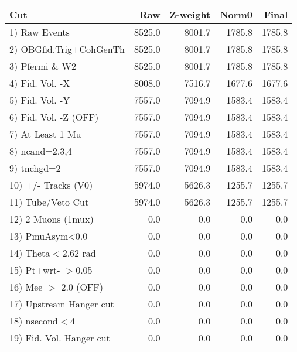  \begin{table}[h!]\centering
 \begin{tabular}{||l||r|r|r|r||}
 \hline
 \hline
 Cut & Raw & Z-weight & Norm0 & Final \\
 \hline
  1) Raw Events           &      8525.0 &      8001.7 &      1785.8 &      1785.8 \\
  2) OBGfid,Trig+CohGenTh &      8525.0 &      8001.7 &      1785.8 &      1785.8 \\
  3) Pfermi \& W2         &      8525.0 &      8001.7 &      1785.8 &      1785.8 \\
  4) Fid. Vol. -X         &      8008.0 &      7516.7 &      1677.6 &      1677.6 \\
  5) Fid. Vol. -Y         &      7557.0 &      7094.9 &      1583.4 &      1583.4 \\
  6) Fid. Vol. -Z (OFF)   &      7557.0 &      7094.9 &      1583.4 &      1583.4 \\
  7) At Least 1 Mu        &      7557.0 &      7094.9 &      1583.4 &      1583.4 \\
  8) ncand=2,3,4          &      7557.0 &      7094.9 &      1583.4 &      1583.4 \\
  9) tnchgd=2             &      7557.0 &      7094.9 &      1583.4 &      1583.4 \\
 10) +/- Tracks (V0)      &      5974.0 &      5626.3 &      1255.7 &      1255.7 \\
 11) Tube/Veto Cut        &      5974.0 &      5626.3 &      1255.7 &      1255.7 \\
 12) 2 Muons (1mux)       &         0.0 &         0.0 &         0.0 &         0.0 \\
 13) PmuAsym<0.0          &         0.0 &         0.0 &         0.0 &         0.0 \\
 14) Theta$<$2.62 rad     &         0.0 &         0.0 &         0.0 &         0.0 \\
 15) Pt+wrt- $>$0.05      &         0.0 &         0.0 &         0.0 &         0.0 \\
 16) Mee $>$ 2.0  (OFF)   &         0.0 &         0.0 &         0.0 &         0.0 \\
 17) Upstream Hanger cut  &         0.0 &         0.0 &         0.0 &         0.0 \\
 18) nsecond$<$4          &         0.0 &         0.0 &         0.0 &         0.0 \\
 19) Fid. Vol. Hanger cut &         0.0 &         0.0 &         0.0 &         0.0 \\

\end{tabular}
\end{table}

